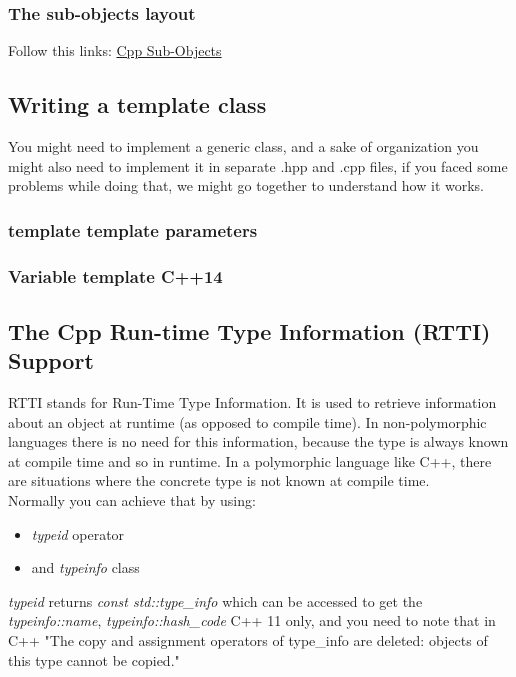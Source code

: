 \documentclass{article}
\begin{document}
\subsubsection{The sub-objects layout}
Follow this links: \href{https://www.linuxtopia.org/online_books/programming_books/c++_practical_programming/c++_practical_programming_222.html}{Cpp Sub-Objects}

\subsection{Writing a template class}
You might need to implement a generic class, and a sake of organization you might also need to implement it in separate .hpp and .cpp files, if you faced some problems while doing that, we might go together to understand how it works.

\subsubsection{template template parameters}

\subsubsection{Variable template C++14}

\subsection{The Cpp Run-time Type Information (RTTI) Support}
RTTI stands for Run-Time Type Information. It is used to retrieve information about an object at runtime (as opposed to compile time). In non-polymorphic languages there is no need for this information, because the type is always known at compile time and so in runtime. In a polymorphic language like C++, there are situations where the concrete type is not known at compile time.\\

Normally you can achieve that by using:
\begin{itemize}
  \item \textit{typeid} operator
  \item and \textit{typeinfo} class 
\end{itemize}

\textit{typeid} returns \textit{const std::type\_info} which can be accessed to get the \textit{typeinfo::name}, \textit{typeinfo::hash\_code} C++ 11 only, and you need to note that in C++ "The copy and assignment operators of type\_info are deleted: objects of this type cannot be copied."\\

\end{document}
